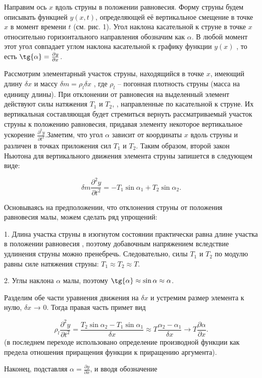 \documentclass[a4paper,12pt]{article} %
\begin{document}
Направим ось $x$ вдоль струны в положении равновесия. Форму струны будем описывать функцией $y (x,t)$, определяющей её вертикальное смещение в
точке $x$ в момент времени $t$ (см. рис. 1). Угол наклона касательной к струне в
точке $x$ относительно горизонтального направления обозначим как $\alpha$. В любой момент этот угол совпадает углом наклона касательной к графику функции $y(x)$ , то есть $\tg{\alpha} = \frac{\partial y}{\partial x}$.

Рассмотрим элементарный участок струны, находящийся в точке $x$, имеющий длину $\delta x$ и массу $\delta m = \rho_l \delta x$ , где $\rho_l	$ -- погонная плотность струны
(масса на единицу длины). При отклонении от равновесия на выделенный
элемент действуют силы натяжения $T_1$ и $T_2$, , направленные по касательной к
струне. Их вертикальная составляющая будет стремиться вернуть рассматриваемый участок струны к положению равновесия, придавая элементу некоторое вертикальное ускорение $\frac{\partial^2{y}}{\partial{t^2}}$.Заметим, что угол $\alpha$ зависит от координаты
$x$ вдоль струны и различен в точках приложения сил $T_1$ и $T_2$. Таким образом,
второй закон Ньютона для вертикального движения элемента струны запишется в следующем виде: 

\[ \delta m\frac{\partial^2{y}}{\partial{t^2}} = -T_1\sin{\alpha_1} + T_2\sin{\alpha_2} .\]

Основываясь на предположении, что отклонения струны от положения
равновесия малы, можем сделать ряд упрощений:

1. Длина участка струны в изогнутом состоянии практически равна
длине участка в положении равновесия
, поэтому добавочным напряжением вследствие удлинения струны можно пренебречь. Следовательно, силы $T_1$ и $T_2$ по модулю равны силе натяжения струны: $T_1 \approx T_2 \approx T.$

2. Углы наклона $\alpha$ малы, поэтому $\tg{\alpha} \approx \sin{\alpha} \approx \alpha$.

Разделим обе части уравнения движения на $\delta x$ и устремим размер элемента к нулю, $\delta x$ → 0. Тогда правая часть примет вид

\[ \rho_l \frac{\partial^2{y}}{\partial{t^2}} = \frac{T_2 \sin{\alpha_2} - T_1 \sin{\alpha_1}}{\delta x} \approx T \frac{\alpha_2 - \alpha_1}{\delta x} \rightarrow T\frac{\partial{\alpha}}{\partial{x}}. \]
(в последнем переходе использовано определение производной функции как
предела отношения приращения функции к приращению аргумента).

Наконец, подставляя $\alpha = \frac{\partial y}{\partial x}$, и вводя обозначение
\end{document}
